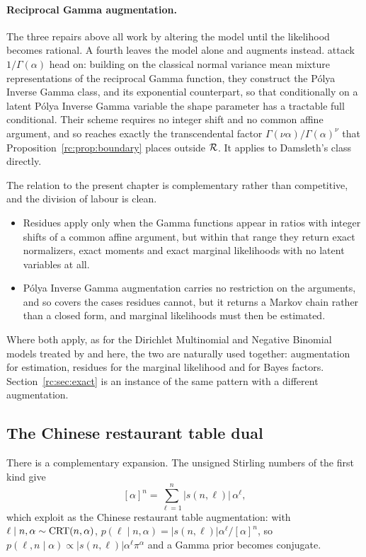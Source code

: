 \paragraph{Reciprocal Gamma augmentation.} The three repairs above all work by altering the model until the likelihood becomes rational. A fourth leaves the model alone and augments instead. \citet{rc:he2019,rc:he2021} attack $1/\Gamma(\alpha)$ head on: building on the classical normal variance mean mixture representations of the reciprocal Gamma function, they construct the P\'olya Inverse Gamma class, and its exponential counterpart, so that conditionally on a latent P\'olya Inverse Gamma variable the shape parameter has a tractable full conditional. Their scheme requires no integer shift and no common affine argument, and so reaches exactly the transcendental factor $\Gamma(\nu\alpha)/\Gamma(\alpha)^\nu$ that Proposition~\ref{rc:prop:boundary} places outside $\mathcal{R}$. It applies to Damsleth's class directly.

The relation to the present chapter is complementary rather than competitive, and the division of labour is clean.
\begin{itemize}
\item Residues apply only when the Gamma functions appear in ratios with integer shifts of a common affine argument, but within that range they return exact normalizers, exact moments and exact marginal likelihoods with no latent variables at all.
\item P\'olya Inverse Gamma augmentation carries no restriction on the arguments, and so covers the cases residues cannot, but it returns a Markov chain rather than a closed form, and marginal likelihoods must then be estimated.
\end{itemize}
Where both apply, as for the Dirichlet Multinomial and Negative Binomial models treated by \citet{rc:he2019} and here, the two are naturally used together: augmentation for estimation, residues for the marginal likelihood and for Bayes factors. Section~\ref{rc:sec:exact} is an instance of the same pattern with a different augmentation.

\subsection{The Chinese restaurant table dual}\label{rc:sec:crt}

There is a complementary expansion. The unsigned Stirling numbers of the first kind give
\begin{equation}\label{rc:eq:stirling}
[\alpha]^n=\sum_{\ell=1}^n|s(n,\ell)|\,\alpha^\ell,
\end{equation}
which \citet{rc:zhou2015} exploit as the Chinese restaurant table augmentation: with $\ell\mid n,\alpha\sim\mathrm{CRT}(n,\alpha)$, $p(\ell\mid n,\alpha)=|s(n,\ell)|\alpha^\ell/[\alpha]^n$, so $p(\ell,n\mid\alpha)\propto|s(n,\ell)|\alpha^\ell\pi^\alpha$ and a Gamma prior becomes conjugate.

